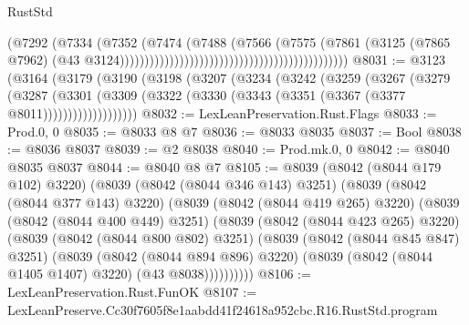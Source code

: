 \begin{lexlean}{RustStd}
\begin{coremodule}
                                                                            (@7292
                                                                              (@7334
                                                                                (@7352
                                                                                  (@7474
                                                                                    (@7488
                                                                                      (@7566
                                                                                        (@7575
                                                                                          (@7861
                                                                                            (@3125
                                                                                              (@7865
                                                                                                @7962)
                                                                                              (@43
                                                                                                @3124))))))))))))))))))))))))))))))))))))))))))))))
@8031 := @3123
    (@3164
      (@3179
        (@3190
          (@3198
            (@3207
              (@3234
                (@3242
                  (@3259
                    (@3267
                      (@3279
                        (@3287
                          (@3301
                            (@3309
                              (@3322 (@3330 (@3343 (@3351 (@3367 (@3377 @8011)))))))))))))))))))
@8032 := LexLeanPreservation.Rust.Flags
@8033 := Prod.{0, 0}
@8035 := @8033 @8 @7
@8036 := @8033 @8035
@8037 := Bool
@8038 := @8036 @8037
@8039 := @2 @8038
@8040 := Prod.mk.{0, 0}
@8042 := @8040 @8035 @8037
@8044 := @8040 @8 @7
@8105 := @8039
    (@8042 (@8044 @179 @102) @3220)
    (@8039
      (@8042 (@8044 @346 @143) @3251)
      (@8039
        (@8042 (@8044 @377 @143) @3220)
        (@8039
          (@8042 (@8044 @419 @265) @3220)
          (@8039
            (@8042 (@8044 @400 @449) @3251)
            (@8039
              (@8042 (@8044 @423 @265) @3220)
              (@8039
                (@8042 (@8044 @800 @802) @3251)
                (@8039
                  (@8042 (@8044 @845 @847) @3251)
                  (@8039
                    (@8042 (@8044 @894 @896) @3220)
                    (@8039 (@8042 (@8044 @1405 @1407) @3220) (@43 @8038))))))))))
@8106 := LexLeanPreservation.Rust.FunOK
@8107 := LexLeanPreserve.Cc30f7605f8e1aabdd41f24618a952cbc.R16.RustStd.program

\end{coremodule}
\end{lexlean}
